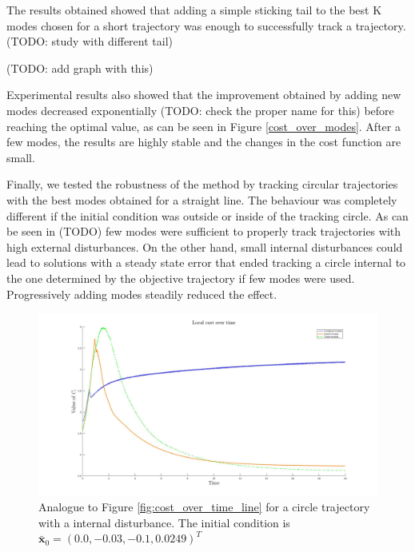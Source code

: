 \documentclass[12,twoside]{TFG-GM}
\theoremstyle{definition}
\theoremstyle{remark}
\newcommand*\diff[1]{\bar{#1}}
\begin{document}
The results obtained showed that adding a simple sticking tail to the best K modes chosen for a short trajectory was enough to successfully track a trajectory. (TODO: study with different tail)

(TODO: add graph with this)

Experimental results also showed that the improvement obtained by adding new modes decreased exponentially (TODO: check the proper name for this) before reaching the optimal value, as can be seen in Figure \ref{cost_over_modes}. After a few modes, the results are highly stable and the changes in the cost function are small.

Finally, we tested the robustness of the method by tracking circular trajectories with the best modes obtained for a straight line. The behaviour was completely different if the initial condition was outside or inside of the tracking circle. As can be seen in (TODO) few modes were sufficient to properly track trajectories with high external disturbances. On the other hand, small internal disturbances could lead to solutions with a steady state error that ended tracking a circle internal to the one determined by the objective trajectory if few modes were used. Progressively adding modes steadily reduced the effect.

\begin{figure}[htb!]
\begin{center}
\includegraphics[width=16cm]{old_vs_new_circle_interior.jpg}
\caption{\label{fig:old_vs_new_circle_internal} \small Analogue to Figure \ref{fig:cost_over_time_line} for a circle trajectory with a internal disturbance. The initial condition is $\diff{\textbf{x}}_0 = (0.0, -0.03, -0.1, 0.0249)^T$}
\end{center}
\end{figure}
\end{document}
